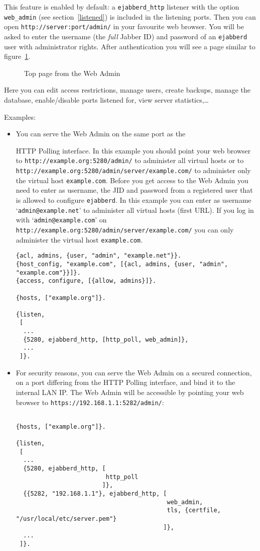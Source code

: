\documentclass[a4paper,10pt]{book}
\newcommand{\ind}[1]{\begin{latexonly}\index{#1}\end{latexonly}}
\newcommand{\imgscale}{0.58}
\newcommand{\insimg}[1]{\insscaleimg{\imgscale}{#1}}
\newcommand{\insscaleimg}[2]{
  \imgsrc{#2}{}
  \begin{latexonly}
    \scalebox{#1}{\texttt{[image: \#2]}}
  \end{latexonly}
}
\newcommand{\jid}[1]{\texttt{#1}}
\newcommand{\term}[1]{\texttt{#1}}
\newcommand{\ejabberd}{\texttt{ejabberd}}
\newcommand{\Jabber}{Jabber}
\begin{document}
This feature is enabled by default:
a \term{ejabberd\_http} listener with the option \term{web\_admin} (see
section~\ref{listened}) is included in the listening ports. Then you can open
\verb|http://server:port/admin/| in your favourite web browser. You
will be asked to enter the username (the \emph{full} \Jabber{} ID) and password
of an \ejabberd{} user with administrator rights. After authentication
you will see a page similar to figure~\ref{fig:webadmmain}.

\begin{figure}[htbp]
  \centering
  \insimg{webadmmain.png}
  \caption{Top page from the Web Admin}
  \label{fig:webadmmain}
\end{figure}
Here you can edit access restrictions, manage users, create backups,
manage the database, enable/disable ports listened for, view server
statistics,\ldots

Examples:
\begin{itemize}
\item You can serve the Web Admin on the same port as the
  \ind{protocols!XEP-0025: HTTP Polling}HTTP Polling interface. In this example
  you should point your web browser to \verb|http://example.org:5280/admin/| to
  administer all virtual hosts or to
  \verb|http://example.org:5280/admin/server/example.com/| to administer only
  the virtual host \jid{example.com}. Before you get access to the Web Admin
  you need to enter as username, the JID and password from a registered user
  that is allowed to configure \ejabberd{}. In this example you can enter as
  username `\jid{admin@example.net}' to administer all virtual hosts (first
  URL). If you log in with `\jid{admin@example.com}' on \\
  \verb|http://example.org:5280/admin/server/example.com/| you can only
  administer the virtual host \jid{example.com}.
\begin{verbatim}
{acl, admins, {user, "admin", "example.net"}}.
{host_config, "example.com", [{acl, admins, {user, "admin", "example.com"}}]}.
{access, configure, [{allow, admins}]}.

{hosts, ["example.org"]}.

{listen,
 [
  ...
  {5280, ejabberd_http, [http_poll, web_admin]},
  ...
 ]}.
\end{verbatim}
\item For security reasons, you can serve the Web Admin on a secured
  connection, on a port differing from the HTTP Polling interface, and bind it
  to the internal LAN IP. The Web Admin will be accessible by pointing your
  web browser to \verb|https://192.168.1.1:5282/admin/|:
\begin{verbatim}

{hosts, ["example.org"]}.

{listen,
 [
  ...
  {5280, ejabberd_http, [
                         http_poll
                        ]},
  {{5282, "192.168.1.1"}, ejabberd_http, [
                                          web_admin,
                                          tls, {certfile, "/usr/local/etc/server.pem"}
                                         ]},
  ...
 ]}.
\end{verbatim}
\end{itemize}
\end{document}

